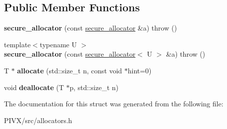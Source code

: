 \subsection*{Public Member Functions}
\begin{DoxyCompactItemize}
\item 
\mbox{\label{structsecure__allocator_ae5bfb3589a310e55894bae988d566c44}} 
{\bfseries secure\+\_\+allocator} (const \mbox{\hyperlink{structsecure__allocator}{secure\+\_\+allocator}} \&a)  throw ()
\item 
\mbox{\label{structsecure__allocator_ad7605317012ed2eed2eecb955345d140}} 
{\footnotesize template$<$typename U $>$ }\\{\bfseries secure\+\_\+allocator} (const \mbox{\hyperlink{structsecure__allocator}{secure\+\_\+allocator}}$<$ U $>$ \&a)  throw ()
\item 
\mbox{\label{structsecure__allocator_aee6c375ead3ab5b477898787308bd2d9}} 
T $\ast$ {\bfseries allocate} (std\+::size\+\_\+t n, const void $\ast$hint=0)
\item 
\mbox{\label{structsecure__allocator_af86cc49185bd507b8b479e070d744eb0}} 
void {\bfseries deallocate} (T $\ast$p, std\+::size\+\_\+t n)
\end{DoxyCompactItemize}


The documentation for this struct was generated from the following file\+:\begin{DoxyCompactItemize}
\item 
P\+I\+V\+X/src/allocators.\+h\end{DoxyCompactItemize}
